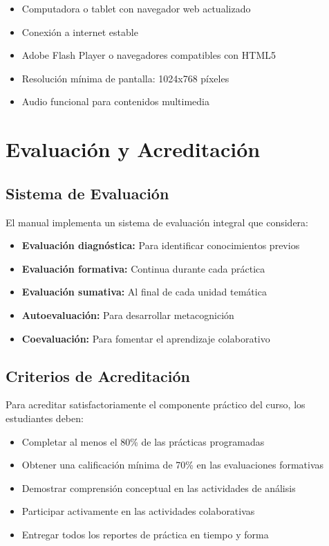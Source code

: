 \documentclass[12pt,a4paper]{book}
\begin{document}
	\begin{itemize}
		\item Computadora o tablet con navegador web actualizado
		\item Conexión a internet estable
		\item Adobe Flash Player o navegadores compatibles con HTML5
		\item Resolución mínima de pantalla: 1024x768 píxeles
		\item Audio funcional para contenidos multimedia
	\end{itemize}
	
	\section{Evaluación y Acreditación}
	
	\subsection{Sistema de Evaluación}
	
	El manual implementa un sistema de evaluación integral que considera:
	
	\begin{itemize}
		\item \textbf{Evaluación diagnóstica:} Para identificar conocimientos previos
		\item \textbf{Evaluación formativa:} Continua durante cada práctica
		\item \textbf{Evaluación sumativa:} Al final de cada unidad temática
		\item \textbf{Autoevaluación:} Para desarrollar metacognición
		\item \textbf{Coevaluación:} Para fomentar el aprendizaje colaborativo
	\end{itemize}
	
	\subsection{Criterios de Acreditación}
	
	Para acreditar satisfactoriamente el componente práctico del curso, los estudiantes deben:
	
	\begin{itemize}
		\item Completar al menos el 80\% de las prácticas programadas
		\item Obtener una calificación mínima de 70\% en las evaluaciones formativas
		\item Demostrar comprensión conceptual en las actividades de análisis
		\item Participar activamente en las actividades colaborativas
		\item Entregar todos los reportes de práctica en tiempo y forma
	\end{itemize}
	
\end{document}
